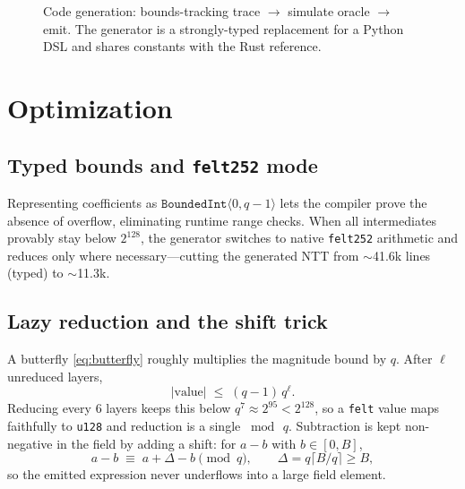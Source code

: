 \documentclass[11pt]{article}
\begin{document}
\begin{figure}[h]
\centering
{}
\caption{Code generation: bounds-tracking trace $\to$ simulate oracle $\to$ emit. The
generator is a strongly-typed replacement for a Python DSL and shares constants with the Rust
reference.}
\label{fig:codegen}
\end{figure}

\section{Optimization}\label{sec:opt}

\subsection{Typed bounds and \texttt{felt252} mode}
Representing coefficients as $\texttt{BoundedInt}\langle0,q{-}1\rangle$ lets the compiler prove
the absence of overflow, eliminating runtime range checks. When all intermediates provably stay
below $2^{128}$, the generator switches to native \texttt{felt252} arithmetic and reduces only
where necessary---cutting the generated NTT from $\sim$41.6k lines (typed) to $\sim$11.3k.

\subsection{Lazy reduction and the shift trick}\label{sec:lazy}
A butterfly \eqref{eq:butterfly} roughly multiplies the magnitude bound by $q$. After $\ell$
unreduced layers,
\begin{equation}
  |\text{value}| \;\le\; (q-1)\,q^{\ell}.
\end{equation}
Reducing every $6$ layers keeps this below $q^{7}\approx 2^{95} < 2^{128}$, so a \texttt{felt}
value maps faithfully to \texttt{u128} and reduction is a single $\bmod\,q$. Subtraction is
kept non-negative in the field by adding a shift: for $a-b$ with $b\in[0,B]$,
\begin{equation}
  a - b \;\equiv\; a + \Delta - b \pmod q,\qquad \Delta = q\bigl\lceil B/q\bigr\rceil \ge B,
\end{equation}
so the emitted expression never underflows into a large field element.
\end{document}
